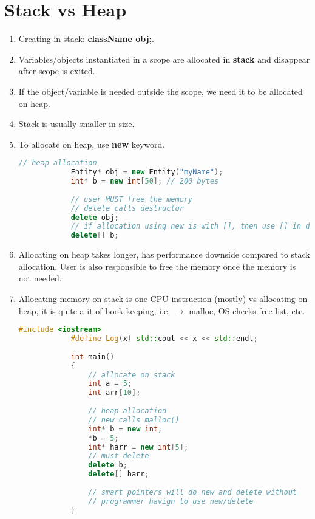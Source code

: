 \documentclass{article}
\begin{document}
\section{Stack vs Heap}
    \begin{enumerate}
        \item Creating in stack: \textbf{className obj;}.
        \item Variables/objects instantiated in a scope are allocated in \textbf{stack} and disappear after scope is exited.
        \item If the object/variable is needed outside the scope, we need it to be allocated on heap.
        \item Stack is usually smaller in size. 
        \item To allocate on heap, use \textbf{new} keyword.
        \begin{lstlisting}[language=C++, caption=Heap allocation using "new" example]
            // heap allocation
            Entity* obj = new Entity("myName");
            int* b = new int[50]; // 200 bytes
            
            // user MUST free the memory
            // delete calls destructor
            delete obj;
            // if allocation using new is with [], then use [] in delete as well
            delete[] b;
        \end{lstlisting}
        
        \item Allocating on heap takes longer, has performance downside compared to stack allocation. User is also responsible to free the memory once the memory is not needed.
        \item Allocating memory on stack is one CPU instruction (mostly) vs allocating on heap, it is quite a it of book-keeping, i.e. $\rightarrow$ malloc, OS checks free-list, etc.
        
        \begin{lstlisting}[language=C++, caption=Stack vs Heap example]
            #include <iostream>
            #define Log(x) std::cout << x << std::endl;
            
            int main()
            {
            	// allocate on stack
            	int a = 5;
            	int arr[10];
            
            	// heap allocation
            	// new calls malloc()
            	int* b = new int;
            	*b = 5;
            	int* harr = new int[5];
            	// must delete
            	delete b;
            	delete[] harr;
            
            	// smart pointers will do new and delete without
            	// programmer havign to use new/delete
            }
            
        \end{lstlisting}
    \end{enumerate}
            
\end{document}
